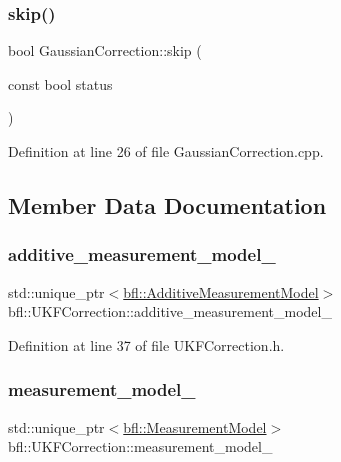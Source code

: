 \subsubsection{\texorpdfstring{skip()}{skip()}}
{\footnotesize\ttfamily bool Gaussian\+Correction\+::skip (\begin{DoxyParamCaption}\item[{const bool}]{status }\end{DoxyParamCaption})\hspace{0.3cm}{\ttfamily [inherited]}}



Definition at line 26 of file Gaussian\+Correction.\+cpp.



\subsection{Member Data Documentation}
\mbox{\label{classbfl_1_1UKFCorrection_a6542ea86f241a7f02973f3fd73a736d5}} 
\subsubsection{\texorpdfstring{additive\+\_\+measurement\+\_\+model\+\_\+}{additive\_measurement\_model\_}}
{\footnotesize\ttfamily std\+::unique\+\_\+ptr$<$\mbox{\hyperlink{classbfl_1_1AdditiveMeasurementModel}{bfl\+::\+Additive\+Measurement\+Model}}$>$ bfl\+::\+U\+K\+F\+Correction\+::additive\+\_\+measurement\+\_\+model\+\_\+\hspace{0.3cm}{\ttfamily [protected]}}



Definition at line 37 of file U\+K\+F\+Correction.\+h.

\mbox{\label{classbfl_1_1UKFCorrection_a4547670b106bd50c9f6716e665559000}} 
\subsubsection{\texorpdfstring{measurement\+\_\+model\+\_\+}{measurement\_model\_}}
{\footnotesize\ttfamily std\+::unique\+\_\+ptr$<$\mbox{\hyperlink{classbfl_1_1MeasurementModel}{bfl\+::\+Measurement\+Model}}$>$ bfl\+::\+U\+K\+F\+Correction\+::measurement\+\_\+model\+\_\+\hspace{0.3cm}{\ttfamily [protected]}}



